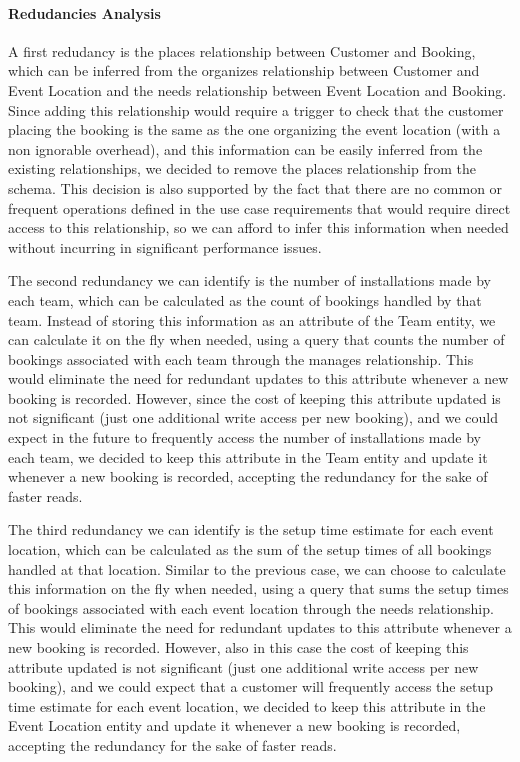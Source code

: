 \paragraph{Redudancies Analysis}

A first redudancy is the places relationship between Customer and Booking, which can be inferred from the organizes relationship between Customer and Event Location and the needs relationship between Event Location and Booking. Since adding this relationship would require a trigger to check that the customer placing the booking is the same as the one organizing the event location (with a non ignorable overhead), and this information can be easily inferred from the existing relationships, we decided to remove the places relationship from the schema. This decision is also supported by the fact that there are no common or frequent operations defined in the use case requirements that would require direct access to this relationship, so we can afford to infer this information when needed without incurring in significant performance issues.

The second redundancy we can identify is the number of installations made by each team, which can be calculated as the count of bookings handled by that team. Instead of storing this information as an attribute of the Team entity, we can calculate it on the fly when needed, using a query that counts the number of bookings associated with each team through the manages relationship. This would eliminate the need for redundant updates to this attribute whenever a new booking is recorded. However, since the cost of keeping this attribute updated is not significant (just one additional write access per new booking), and we could expect in the future to frequently access the number of installations made by each team, we decided to keep this attribute in the Team entity and update it whenever a new booking is recorded, accepting the redundancy for the sake of faster reads.

The third redundancy we can identify is the setup time estimate for each event location, which can be calculated as the sum of the setup times of all bookings handled at that location. Similar to the previous case, we can choose to calculate this information on the fly when needed, using a query that sums the setup times of bookings associated with each event location through the needs relationship. This would eliminate the need for redundant updates to this attribute whenever a new booking is recorded. However, also in this case the cost of keeping this attribute updated is not significant (just one additional write access per new booking), and we could expect that a customer will frequently access the setup time estimate for each event location, we decided to keep this attribute in the Event Location entity and update it whenever a new booking is recorded, accepting the redundancy for the sake of faster reads.

